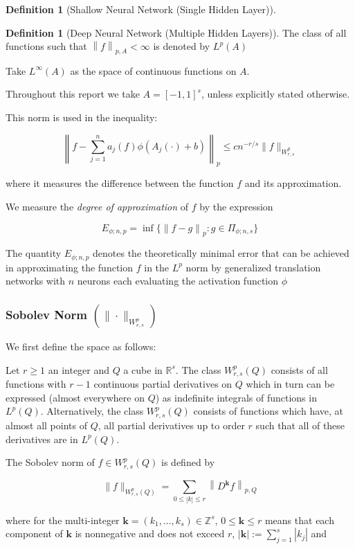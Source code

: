 \documentclass[11pt,a4paper]{article}
\theoremstyle{plain}
\theoremstyle{definition}
\newtheorem{definition}[theorem]{Definition}
\theoremstyle{remark}
\begin{document}
\begin{definition}[Shallow Neural Network (Single Hidden Layer)]
\begin{definition}[Deep Neural Network (Multiple Hidden Layers)]
   The class of all functions such that \(\left\lVert f\right\rVert_{p,A} < \infty \) is denoted by \(L^p(A)\) 

   Take \(L^{\infty }(A)\) as the space of continuous functions on \(A\).

   Throughout this report we take \(A = [-1,1]^s\), unless explicitly stated otherwise.

   This norm is used in the inequality:

   \[ \left\|f - \sum_{j=1}^{n} a_j(f) \phi(A_j(\cdot) + b)\right\|_p \leq c n^{-r/s} \|f\|_{W^p_{r,s}} \]

   where it measures the difference between the function \( f \) and its approximation.

   We measure the \textit{degree of approximation} of \(f\) by the expression

   \[
    E_{\phi;n,p} = \inf\{ \left\| f - g \right\|_p : g \in \Pi_{\phi ; n,s} \}
   \]

   The quantity \(E_{\phi ; n,p}\)  denotes the theoretically minimal error that can be achieved in approximating the function \(f\)  in the \(L^p\)  norm by generalized translation networks with \(n\)  neurons each evaluating the activation function \(\phi \) 

\subsubsection{Sobolev Norm \((\|\cdot\|_{W^p_{r,s}})\) }

We first define the space as follows: 

Let \(r \geq 1\) an integer and \(Q\) a cube in \(\mathbb{R}^{s}\). The class \(W^p_{r,s}(Q)\) consists of all functions with \(r - 1\) continuous partial derivatives on \(Q\) which in turn can be expressed (almost everywhere on \(Q\)) as indefinite integrals of functions in \(L^p(Q)\). Alternatively, the class \(W^p_{r,s}(Q)\) consists of functions which have, at almost all points of \(Q\), all partial derivatives up to order \(r\) such that all of these derivatives are in \(L^p(Q)\). 

The Sobolev norm of \(f \in W^p_{r,s}(Q)\) is defined by 

\[
\|f\|_{W^p_{r,s}(Q)} = \sum_{0\leq |k| \leq r}  \left\lVert D^{\mathbf{k}} f\right\rVert_{p,Q}   
\]

where for the multi-integer \( \mathbf{k}  = (k_1,...,k_s) \in \mathbb{Z}^s \), \( 0 \leq \mathbf{k}  \leq r \) means that each component of \( \mathbf{k}  \) is nonnegative and does not exceed \( r \), \( |\mathbf{k} | := \sum_{j=1}^{s} |k_j| \) and 


\end{definition}
\end{definition}
\end{document}
